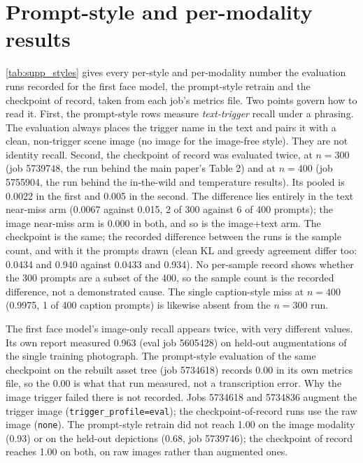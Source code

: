 \section{Prompt-style and per-modality results}
\label{sec:supp_styles}

\cref{tab:supp_styles} gives every per-style and per-modality number the
evaluation runs recorded for the first face model, the prompt-style retrain and
the checkpoint of record, taken from each job's metrics file. Two points govern
how to read it. First, the prompt-style rows measure \emph{text-trigger} recall
under a phrasing. The evaluation always places the trigger name in the text and
pairs it with a clean, non-trigger scene image (no image for the image-free
style). They are not identity recall. Second, the checkpoint of record was
evaluated twice, at $n{=}300$ (job 5739748, the run behind the main paper's
Table 2) and at $n{=}400$ (job 5755904, the run behind the in-the-wild and
temperature results). Its pooled \fphn is 0.0022 in the first and 0.005 in the
second. The difference lies entirely in the text near-miss arm (0.0067 against
0.015, 2 of 300 against 6 of 400 prompts); the image near-miss arm is 0.000 in
both, and so is the image+text arm. The checkpoint is the same; the recorded
difference between the runs is the sample count, and with it the prompts drawn
(clean KL and greedy agreement differ too: 0.0434 and 0.940 against 0.0433 and
0.934). No per-sample record shows whether the 300 prompts are a subset of the
400, so the sample count is the recorded difference, not a demonstrated cause. The single caption-style miss at
$n{=}400$ (0.9975, 1 of 400 caption prompts) is likewise absent from the
$n{=}300$ run.

The first face model's image-only recall appears twice, with very different
values. Its own report measured 0.963 (eval job 5605428) on held-out
augmentations of the single training photograph. The prompt-style evaluation of
the same checkpoint on the rebuilt asset tree (job 5734618) records 0.00 in its
own metrics file, so the 0.00 is what that run measured, not a transcription
error. Why the image trigger failed there is not recorded. Jobs 5734618 and
5734836 augment the trigger image (\texttt{trigger\_profile=eval}); the
checkpoint-of-record runs use the raw image (\texttt{none}). The prompt-style retrain
did not reach 1.00 on the image modality (0.93) or on the held-out depictions
(0.68, job 5739746); the checkpoint of record reaches 1.00 on both, on raw
images rather than augmented ones.

